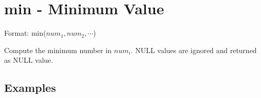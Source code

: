 
%

\section{min - Minimum Value\label{sect:min}}

Format: min($num_1,num_2,\cdots$)

Compute the minimum number in $num_i$. 
NULL values are ignored and returned as NULL value. 


\subsection*{Examples}


%

